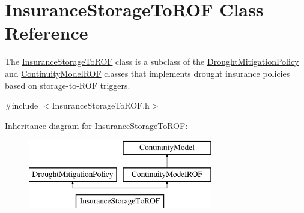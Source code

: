 \hypertarget{classInsuranceStorageToROF}{}\section{Insurance\+Storage\+To\+R\+OF Class Reference}
\label{classInsuranceStorageToROF}


The {\ttfamily \mbox{\hyperlink{classInsuranceStorageToROF}{Insurance\+Storage\+To\+R\+OF}}} class is a subclass of the {\ttfamily \mbox{\hyperlink{classDroughtMitigationPolicy}{Drought\+Mitigation\+Policy}}} and {\ttfamily \mbox{\hyperlink{classContinuityModelROF}{Continuity\+Model\+R\+OF}}} classes that implements drought insurance policies based on storage-\/to-\/\+R\+OF triggers.  




{\ttfamily \#include $<$Insurance\+Storage\+To\+R\+O\+F.\+h$>$}

Inheritance diagram for Insurance\+Storage\+To\+R\+OF\+:\begin{figure}[H]
\begin{center}
\leavevmode
\includegraphics[height=3.000000cm]{classInsuranceStorageToROF}
\end{center}
\end{figure}

